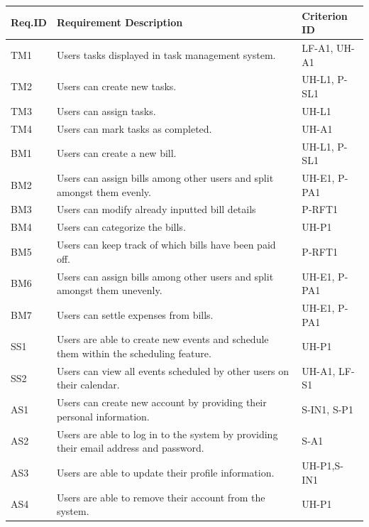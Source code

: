 \documentclass[12pt]{article}
\begin{document}
\begin{center}
    \begin{tabular}{ | p{2cm} | p{8cm} | p{3cm} | }
    \hline
    Req.ID & Requirement Description & Criterion ID \\ \hline
    TM1 & Users tasks displayed in task management system. & LF-A1, UH-A1  \\ \hline
    TM2 & Users can create new tasks. & UH-L1, P-SL1  \\ \hline
    TM3 & Users can assign tasks. & UH-L1 \\ \hline
    TM4 & Users can mark tasks as completed. &  UH-A1 \\ \hline
    BM1 & Users can create a new bill. & UH-L1, P-SL1  \\ \hline
    BM2 & Users can assign bills among other users and split amongst them evenly. &  UH-E1, P-PA1 \\ \hline
    BM3 & Users can modify already inputted bill details & P-RFT1  \\ \hline
    BM4 & Users can categorize the bills. & UH-P1  \\ \hline
    BM5 & Users can keep track of which bills have been paid off. & P-RFT1  \\ \hline
    BM6 & Users can assign bills among other users and split amongst them unevenly. & UH-E1, P-PA1  \\ \hline
    BM7 & Users can settle expenses from bills. & UH-E1, P-PA1  \\ \hline
    SS1 & Users are able to create new events and schedule them within the scheduling feature. &  UH-P1 \\ \hline
    SS2 & Users can view all events scheduled by other users on their calendar.  &  UH-A1, LF-S1 \\ \hline
    AS1 & Users can create new account by providing their personal information. & S-IN1, S-P1  \\ \hline
    AS2 & Users are able to log in to the system by providing their email address and password. & S-A1  \\ \hline
    AS3 & Users are able to update their profile information. & UH-P1,S-IN1  \\ \hline
    AS4 & Users are able to remove their account from the system. & UH-P1  \\ \hline








    
    \hline
    \end{tabular}
\end{center}
\end{document}
